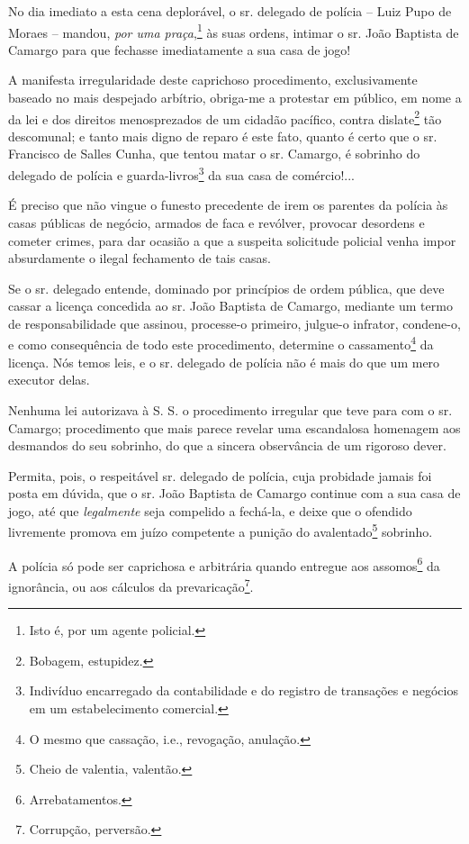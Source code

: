 {No dia imediato a esta cena deplorável, o sr. delegado de polícia --
Luiz Pupo de Moraes -- mandou, \emph{por uma praça},\footnote{ Isto é,
  por um agente policial.} às suas ordens, intimar o sr. João Baptista
de Camargo para que fechasse imediatamente a sua casa de jogo!

A manifesta irregularidade deste caprichoso procedimento, exclusivamente
baseado no mais despejado arbítrio, obriga-me a protestar em público, em
nome a da lei e dos direitos menosprezados de um cidadão pacífico,
contra dislate\footnote{ Bobagem, estupidez.} tão descomunal; e tanto
mais digno de reparo é este fato, quanto é certo que o sr. Francisco de
Salles Cunha, que tentou matar o sr. Camargo, é sobrinho do delegado de
polícia e guarda-livros\footnote{ Indivíduo encarregado da
  contabilidade e do registro de transações e negócios em um
  estabelecimento comercial.} da sua casa de comércio!...

É preciso que não vingue o funesto precedente de irem os parentes da
polícia às casas públicas de negócio, armados de faca e revólver,
provocar desordens e cometer crimes, para dar ocasião a que a suspeita
solicitude policial venha impor absurdamente o ilegal fechamento de tais
casas.

Se o sr. delegado entende, dominado por princípios de ordem pública, que
deve cassar a licença concedida ao sr. João Baptista de Camargo,
mediante um termo de responsabilidade que assinou, processe-o primeiro,
julgue-o infrator, condene-o, e como consequência de todo este
procedimento, determine o cassamento\footnote{ O mesmo que cassação,
  i.e., revogação, anulação.} da licença. Nós temos leis, e o sr.
delegado de polícia não é mais do que um mero executor delas.

Nenhuma lei autorizava à S. S. o procedimento irregular que teve para
com o sr. Camargo; procedimento que mais parece revelar uma escandalosa
homenagem aos desmandos do seu sobrinho, do que a sincera observância de
um rigoroso dever.

Permita, pois, o respeitável sr. delegado de polícia, cuja probidade
jamais foi posta em dúvida, que o sr. João Baptista de Camargo continue
com a sua casa de jogo, até que \emph{legalmente} seja compelido a
fechá-la, e deixe que o ofendido livremente promova em juízo competente
a punição do avalentado\footnote{ Cheio de valentia, valentão.}
sobrinho.

A polícia só pode ser caprichosa e arbitrária quando entregue aos
assomos\footnote{ Arrebatamentos.} da ignorância, ou aos cálculos da
prevaricação\footnote{ Corrupção, perversão.}.

}
